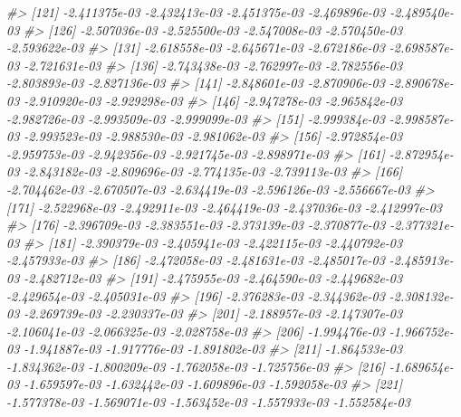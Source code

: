\documentclass[
]{article}
\newenvironment{Shaded}{\begin{snugshade}}{\end{snugshade}}
\newcommand{\CommentTok}[1]{\textcolor[rgb]{0.56,0.35,0.01}{\textit{#1}}}
\begin{document}
\begin{Shaded}
\begin{Highlighting}[]
\CommentTok{\#\textgreater{} [121] {-}2.411375e{-}03 {-}2.432413e{-}03 {-}2.451375e{-}03 {-}2.469896e{-}03 {-}2.489540e{-}03}
\CommentTok{\#\textgreater{} [126] {-}2.507036e{-}03 {-}2.525500e{-}03 {-}2.547008e{-}03 {-}2.570450e{-}03 {-}2.593622e{-}03}
\CommentTok{\#\textgreater{} [131] {-}2.618558e{-}03 {-}2.645671e{-}03 {-}2.672186e{-}03 {-}2.698587e{-}03 {-}2.721631e{-}03}
\CommentTok{\#\textgreater{} [136] {-}2.743438e{-}03 {-}2.762997e{-}03 {-}2.782556e{-}03 {-}2.803893e{-}03 {-}2.827136e{-}03}
\CommentTok{\#\textgreater{} [141] {-}2.848601e{-}03 {-}2.870906e{-}03 {-}2.890678e{-}03 {-}2.910920e{-}03 {-}2.929298e{-}03}
\CommentTok{\#\textgreater{} [146] {-}2.947278e{-}03 {-}2.965842e{-}03 {-}2.982726e{-}03 {-}2.993509e{-}03 {-}2.999099e{-}03}
\CommentTok{\#\textgreater{} [151] {-}2.999384e{-}03 {-}2.998587e{-}03 {-}2.993523e{-}03 {-}2.988530e{-}03 {-}2.981062e{-}03}
\CommentTok{\#\textgreater{} [156] {-}2.972854e{-}03 {-}2.959753e{-}03 {-}2.942356e{-}03 {-}2.921745e{-}03 {-}2.898971e{-}03}
\CommentTok{\#\textgreater{} [161] {-}2.872954e{-}03 {-}2.843182e{-}03 {-}2.809696e{-}03 {-}2.774135e{-}03 {-}2.739113e{-}03}
\CommentTok{\#\textgreater{} [166] {-}2.704462e{-}03 {-}2.670507e{-}03 {-}2.634419e{-}03 {-}2.596126e{-}03 {-}2.556667e{-}03}
\CommentTok{\#\textgreater{} [171] {-}2.522968e{-}03 {-}2.492911e{-}03 {-}2.464419e{-}03 {-}2.437036e{-}03 {-}2.412997e{-}03}
\CommentTok{\#\textgreater{} [176] {-}2.396709e{-}03 {-}2.383551e{-}03 {-}2.373139e{-}03 {-}2.370877e{-}03 {-}2.377321e{-}03}
\CommentTok{\#\textgreater{} [181] {-}2.390379e{-}03 {-}2.405941e{-}03 {-}2.422115e{-}03 {-}2.440792e{-}03 {-}2.457933e{-}03}
\CommentTok{\#\textgreater{} [186] {-}2.472058e{-}03 {-}2.481631e{-}03 {-}2.485017e{-}03 {-}2.485913e{-}03 {-}2.482712e{-}03}
\CommentTok{\#\textgreater{} [191] {-}2.475955e{-}03 {-}2.464590e{-}03 {-}2.449682e{-}03 {-}2.429654e{-}03 {-}2.405031e{-}03}
\CommentTok{\#\textgreater{} [196] {-}2.376283e{-}03 {-}2.344362e{-}03 {-}2.308132e{-}03 {-}2.269739e{-}03 {-}2.230337e{-}03}
\CommentTok{\#\textgreater{} [201] {-}2.188957e{-}03 {-}2.147307e{-}03 {-}2.106041e{-}03 {-}2.066325e{-}03 {-}2.028758e{-}03}
\CommentTok{\#\textgreater{} [206] {-}1.994476e{-}03 {-}1.966752e{-}03 {-}1.941887e{-}03 {-}1.917776e{-}03 {-}1.891802e{-}03}
\CommentTok{\#\textgreater{} [211] {-}1.864533e{-}03 {-}1.834362e{-}03 {-}1.800209e{-}03 {-}1.762058e{-}03 {-}1.725756e{-}03}
\CommentTok{\#\textgreater{} [216] {-}1.689654e{-}03 {-}1.659597e{-}03 {-}1.632442e{-}03 {-}1.609896e{-}03 {-}1.592058e{-}03}
\CommentTok{\#\textgreater{} [221] {-}1.577378e{-}03 {-}1.569071e{-}03 {-}1.563452e{-}03 {-}1.557933e{-}03 {-}1.552584e{-}03}

\end{Highlighting}
\end{Shaded}
\end{document}
